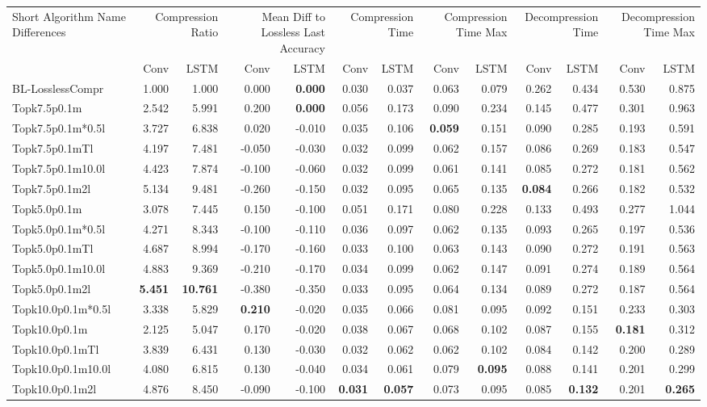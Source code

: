 \begin{tabular}{lrrrrrrrrrrrr}
\toprule
\multicolumn{1}{p{2.5cm}}{Short Algorithm Name Differences} & \multicolumn{2}{p{1.8cm}}{Compression Ratio} & \multicolumn{2}{p{1.8cm}}{Mean Diff to Lossless Last Accuracy} & \multicolumn{2}{p{1.8cm}}{Compression Time} & \multicolumn{2}{p{1.8cm}}{Compression Time Max} & \multicolumn{2}{p{1.8cm}}{Decompression Time} & \multicolumn{2}{p{1.8cm}}{Decompression Time Max} \\
 & Conv & LSTM & Conv & LSTM & Conv & LSTM & Conv & LSTM & Conv & LSTM & Conv & LSTM \\
\midrule
BL-LosslessCompr & 1.000 & 1.000 & 0.000 & \bfseries 0.000 & 0.030 & 0.037 & 0.063 & 0.079 & 0.262 & 0.434 & 0.530 & 0.875 \\
Topk7.5p0.1m & 2.542 & 5.991 & 0.200 & \bfseries 0.000 & 0.056 & 0.173 & 0.090 & 0.234 & 0.145 & 0.477 & 0.301 & 0.963 \\
Topk7.5p0.1m*0.5l & 3.727 & 6.838 & 0.020 & -0.010 & 0.035 & 0.106 & \bfseries 0.059 & 0.151 & 0.090 & 0.285 & 0.193 & 0.591 \\
Topk7.5p0.1mTl & 4.197 & 7.481 & -0.050 & -0.030 & 0.032 & 0.099 & 0.062 & 0.157 & 0.086 & 0.269 & 0.183 & 0.547 \\
Topk7.5p0.1m10.0l & 4.423 & 7.874 & -0.100 & -0.060 & 0.032 & 0.099 & 0.061 & 0.141 & 0.085 & 0.272 & 0.181 & 0.562 \\
Topk7.5p0.1m2l & 5.134 & 9.481 & -0.260 & -0.150 & 0.032 & 0.095 & 0.065 & 0.135 & \bfseries 0.084 & 0.266 & 0.182 & 0.532 \\
Topk5.0p0.1m & 3.078 & 7.445 & 0.150 & -0.100 & 0.051 & 0.171 & 0.080 & 0.228 & 0.133 & 0.493 & 0.277 & 1.044 \\
Topk5.0p0.1m*0.5l & 4.271 & 8.343 & -0.100 & -0.110 & 0.036 & 0.097 & 0.062 & 0.135 & 0.093 & 0.265 & 0.197 & 0.536 \\
Topk5.0p0.1mTl & 4.687 & 8.994 & -0.170 & -0.160 & 0.033 & 0.100 & 0.063 & 0.143 & 0.090 & 0.272 & 0.191 & 0.563 \\
Topk5.0p0.1m10.0l & 4.883 & 9.369 & -0.210 & -0.170 & 0.034 & 0.099 & 0.062 & 0.147 & 0.091 & 0.274 & 0.189 & 0.564 \\
Topk5.0p0.1m2l & \bfseries 5.451 & \bfseries 10.761 & -0.380 & -0.350 & 0.033 & 0.095 & 0.064 & 0.134 & 0.089 & 0.272 & 0.187 & 0.564 \\
Topk10.0p0.1m*0.5l & 3.338 & 5.829 & \bfseries 0.210 & -0.020 & 0.035 & 0.066 & 0.081 & 0.095 & 0.092 & 0.151 & 0.233 & 0.303 \\
Topk10.0p0.1m & 2.125 & 5.047 & 0.170 & -0.020 & 0.038 & 0.067 & 0.068 & 0.102 & 0.087 & 0.155 & \bfseries 0.181 & 0.312 \\
Topk10.0p0.1mTl & 3.839 & 6.431 & 0.130 & -0.030 & 0.032 & 0.062 & 0.062 & 0.102 & 0.084 & 0.142 & 0.200 & 0.289 \\
Topk10.0p0.1m10.0l & 4.080 & 6.815 & 0.130 & -0.040 & 0.034 & 0.061 & 0.079 & \bfseries 0.095 & 0.088 & 0.141 & 0.201 & 0.299 \\
Topk10.0p0.1m2l & 4.876 & 8.450 & -0.090 & -0.100 & \bfseries 0.031 & \bfseries 0.057 & 0.073 & 0.095 & 0.085 & \bfseries 0.132 & 0.201 & \bfseries 0.265 \\
\bottomrule
\end{tabular}
